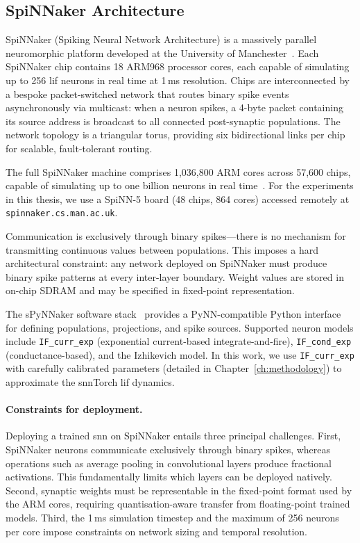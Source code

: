 \subsection{SpiNNaker Architecture}
\label{subsec:spinnaker}

SpiNNaker (Spiking Neural Network Architecture) is a massively parallel neuromorphic platform developed at the University of Manchester~\citep{furber2014}. Each SpiNNaker chip contains 18 ARM968 processor cores, each capable of simulating up to 256 \gls{lif} neurons in real time at 1\,ms resolution. Chips are interconnected by a bespoke packet-switched network that routes binary spike events asynchronously via multicast: when a neuron spikes, a 4-byte packet containing its source address is broadcast to all connected post-synaptic populations. The network topology is a triangular torus, providing six bidirectional links per chip for scalable, fault-tolerant routing.

The full SpiNNaker machine comprises 1{,}036{,}800 ARM cores across 57{,}600 chips, capable of simulating up to one billion neurons in real time~\citep{furber2014}. For the experiments in this thesis, we use a SpiNN-5 board (48 chips, 864 cores) accessed remotely at \texttt{spinnaker.cs.man.ac.uk}.

Communication is exclusively through binary spikes---there is no mechanism for transmitting continuous values between populations. This imposes a hard architectural constraint: any network deployed on SpiNNaker must produce binary spike patterns at every inter-layer boundary. Weight values are stored in on-chip SDRAM and may be specified in fixed-point representation.

The sPyNNaker software stack~\citep{rhodes2018} provides a PyNN-compatible Python interface for defining populations, projections, and spike sources. Supported neuron models include \texttt{IF\_curr\_exp} (exponential current-based integrate-and-fire), \texttt{IF\_cond\_exp} (conductance-based), and the Izhikevich model. In this work, we use \texttt{IF\_curr\_exp} with carefully calibrated parameters (detailed in Chapter~\ref{ch:methodology}) to approximate the snnTorch \gls{lif} dynamics.

\paragraph{Constraints for deployment.}
Deploying a trained \gls{snn} on SpiNNaker entails three principal challenges. First, SpiNNaker neurons communicate exclusively through binary spikes, whereas operations such as average pooling in convolutional layers produce fractional activations. This fundamentally limits which layers can be deployed natively. Second, synaptic weights must be representable in the fixed-point format used by the ARM cores, requiring quantisation-aware transfer from floating-point trained models. Third, the 1\,ms simulation timestep and the maximum of 256 neurons per core impose constraints on network sizing and temporal resolution.

